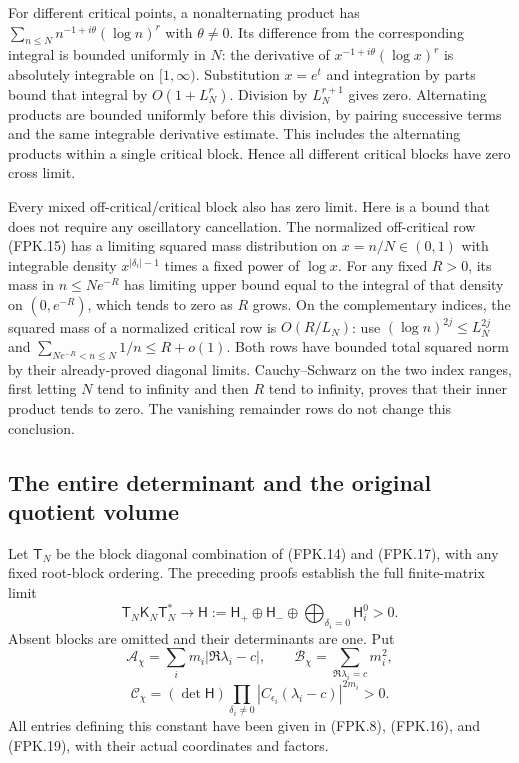 For different critical points, a nonalternating product has
$\sum_{n\leq N}n^{-1+i\theta}(\log n)^r$ with $\theta\ne0$.
Its difference from the corresponding integral is bounded uniformly
in $N$: the derivative of $x^{-1+i\theta}(\log x)^r$ is absolutely
integrable on $[1,\infty)$. Substitution $x=e^t$ and integration
by parts bound that integral by $O(1+L_N^r)$. Division by
$L_N^{r+1}$ gives zero. Alternating products are bounded uniformly
before this division, by pairing successive terms and the same
integrable derivative estimate. This includes the alternating
products within a single critical block. Hence all different critical
blocks have zero cross limit.

Every mixed off-critical/critical block also has zero limit. Here
is a bound that does not require any oscillatory cancellation.
The normalized off-critical row (FPK.15) has a limiting squared
mass distribution on $x=n/N\in(0,1)$ with integrable density
$x^{|\delta_i|-1}$ times a fixed power of $\log x$.
For any fixed $R>0$, its mass in $n\leq Ne^{-R}$ has limiting
upper bound equal to the integral of that density on $(0,e^{-R})$,
which tends to zero as $R$ grows. On the complementary indices,
the squared mass of a normalized critical row is $O(R/L_N)$:
use $(\log n)^{2j}\leq L_N^{2j}$ and
$\sum_{Ne^{-R}<n\leq N}1/n\leq R+o(1)$.
Both rows have bounded total squared norm by their already-proved
diagonal limits. Cauchy--Schwarz on the two index ranges, first
letting $N$ tend to infinity and then $R$ tend to infinity, proves
that their inner product tends to zero. The vanishing remainder
rows do not change this conclusion.

\subsection{The entire determinant and the original quotient volume}

Let $\mathsf T_N$ be the block diagonal combination of
(FPK.14) and (FPK.17), with any fixed root-block ordering. The
preceding proofs establish the full finite-matrix limit
\[
 \mathsf T_N\mathsf K_N\mathsf T_N^*
    \longrightarrow
 \mathsf H:=\mathsf H_+\oplus\mathsf H_-
          \oplus\bigoplus_{\delta_i=0}\mathsf H_i^0>0.
 \tag{FPK.20}
\]
Absent blocks are omitted and their determinants are one. Put
\[
 \mathcal A_\chi=\sum_i m_i|\Re\lambda_i-c|,
 \qquad \mathcal B_\chi=\sum_{\Re\lambda_i=c}m_i^2,
 \tag{FPK.21}
\]
\[
 \mathcal C_\chi
  =(\det\mathsf H)
     \prod_{\delta_i\ne0}|C_{\epsilon_i}(\lambda_i-c)|^{2m_i}>0.
 \tag{FPK.22}
\]
All entries defining this constant have been given in (FPK.8),
(FPK.16), and (FPK.19), with their actual coordinates and factors.

